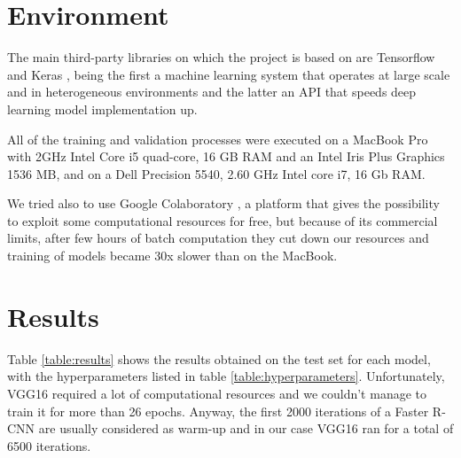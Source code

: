 \documentclass[a4paper,10pt]{report}
\begin{document}
\section{Environment}
The main third-party libraries on which the project is based on are Tensorflow \cite{tensorflow} and Keras \cite{keras}, being the first a machine learning system that operates at large scale and in heterogeneous environments and the latter an API that speeds deep learning model implementation up.

All of the training and validation processes were executed on a MacBook Pro with 2GHz Intel Core i5 quad-core, 16 GB RAM and an Intel Iris Plus Graphics 1536 MB, and on a Dell Precision 5540, 2.60 GHz Intel core i7, 16 Gb RAM.

We tried also to use Google Colaboratory \cite{colab}, a platform that gives the possibility to exploit some computational resources for free, but because of its commercial limits, after few hours of batch computation they cut down our resources and training of models became 30x slower than on the MacBook.

\section{Results}\label{sec:results}
Table \ref{table:results} shows the results obtained on the test set for each model, with the hyperparameters listed in table \ref{table:hyperparameters}.
Unfortunately, VGG16 required a lot of computational resources and we couldn't manage to train it for more than 26 epochs. Anyway, the first 2000 iterations of a Faster R-CNN are usually considered as warm-up \cite{warm-up} and in our case VGG16 ran for a total of 6500 iterations.
\end{document}

